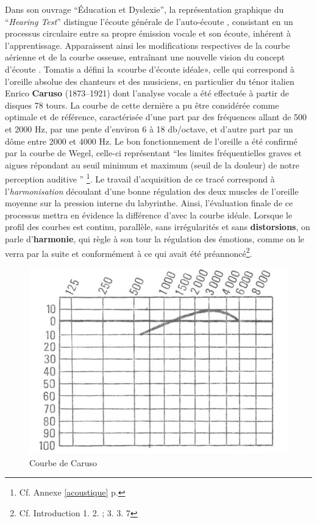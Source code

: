 Dans son ouvrage ``Éducation et
    Dyslexie''\autocite {tomatis:education}, la représentation graphique du
 ``\emph {Hearing Test}'' distingue l'écoute générale de
 l'auto-écoute \autocite {Tomatislangage}, consistant  en un processus
   circulaire entre sa propre  émission vocale et son écoute, inhérent
   à l'apprentissage.
 Apparaissent ainsi les modifications respectives
 de la courbe aérienne et de la courbe osseuse, entraînant une nouvelle vision
 du concept d'écoute \autocite {tomatis_conf}.%
       Tomatis a défini la «courbe d'écoute idéale», celle qui correspond à l'oreille absolue
des chanteurs et des musiciens, en particulier du ténor italien Enrico
\textbf{Caruso} (1873--1921) dont l'analyse vocale a été effectuée à partir de
disques 78 tours. La courbe de cette dernière a pu être considérée comme
optimale et de référence, caractérisée d'une part par des fréquences allant de 500 et 2000
Hz, par une pente d\textquoteright environ 6 à 18 db/octave,
et d'autre part par un dôme entre 2000 et 4000 Hz.
Le bon fonctionnement de l'oreille a été confirmé par la courbe
de Wegel, celle-ci représentant   \enquote {les limites fréquentielles graves et aigues répondant au seuil 
minimum et maximum (seuil de la douleur) de notre perception auditive } 
\autocite{Tomatislangage}\footnote{Cf. Annexe \ref{acoustique} p. \pageref{acoustique}}.
 Le travail d'acquisition de ce tracé correspond à l'\textsl{harmonisation}
découlant d'une bonne régulation des deux muscles de l'oreille moyenne
sur la pression interne du
labyrinthe.
Ainsi, l'évaluation finale de ce processus mettra en évidence la différence
d'avec la courbe idéale.
Lorsque le profil des
courbes est continu, parallèle, sans irrégularités et sans
\textbf{distorsions}, on parle d'\textbf{harmonie}, qui règle à son tour
la régulation des émotions, comme on le verra par la suite et conformément à
ce qui avait été préannoncé\footnote{Cf. Introduction 1. 2. ; 3. 3. 7}.
\begin{center}
	\begin{figure}
		\includegraphics[width=0.9\linewidth]{images/graphiques/courbecarusoideale}	
		\caption{Courbe de Caruso}
	\end{figure}	
\end{center}
